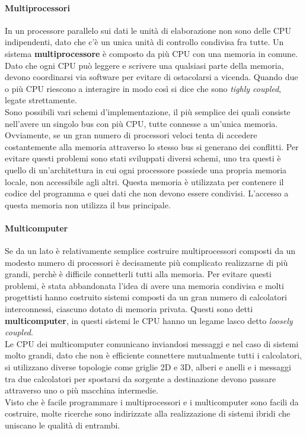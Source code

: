 \documentclass[12pt]{report}
\begin{document}
\paragraph{Multiprocessori} In un processore parallelo sui dati le unità di elaborazione non sono delle CPU indipendenti, dato che c'è un unica unità di controllo condivisa fra tutte. Un sistema \textbf{multiprocessore} è composto da più CPU con una memoria in comune. Dato che ogni CPU può leggere e scrivere una qualsiasi parte della memoria, devono coordinarsi via software per evitare di ostacolarsi a vicenda. Quando due o più CPU riescono a interagire in modo così si dice che sono \textit{tighly coupled}, legate strettamente. \\
Sono possibili vari schemi d'implementazione, il più semplice dei quali consiste nell'avere un singolo bus con più CPU, tutte connesse a un'unica memoria. Ovviamente, se un gran numero di processori veloci tenta di accedere costantemente alla memoria attraverso lo stesso bus si generano dei conflitti. Per evitare questi problemi sono stati sviluppati diversi schemi, uno tra questi è quello di un'architettura in cui ogni processore possiede una propria memoria locale, non accessibile agli altri. Questa memoria è utilizzata per contenere il codice del programma e quei dati che non devono essere condivisi. L'accesso a questa memoria non utilizza il bus principale.
\paragraph{Multicomputer} Se da un lato è relativamente semplice costruire multiprocessori composti da un modesto numero di processori è decisamente più complicato realizzarne di più grandi, perchè è difficile connetterli tutti alla memoria. Per evitare questi problemi, è stata abbandonata l'idea di avere una memoria condivisa e molti progettisti hanno costruito sistemi composti da un gran numero di calcolatori interconnessi, ciascuno dotato di memoria privata. Questi sono detti \textbf{multicomputer}, in questi sistemi le CPU hanno un legame lasco detto \textit{loosely coupled}. \\
Le CPU dei multicomputer comunicano inviandosi messaggi e nel caso di sistemi molto grandi, dato che non è efficiente connettere mutualmente tutti i calcolatori, si utilizzano diverse topologie come griglie 2D e 3D, alberi e anelli e i messaggi tra due calcolatori per spostarsi da sorgente a destinazione devono passare attraverso uno o più macchina intermedie. \\
Visto che è facile programmare i multiprocessori e i multicomputer sono facili da costruire, molte ricerche sono indirizzate alla realizzazione di sistemi ibridi che uniscano le qualità di entrambi.
\end{document}
